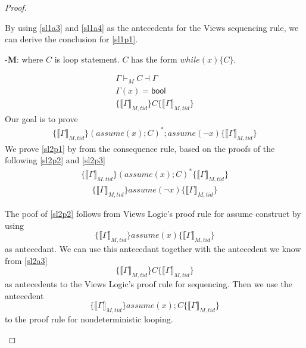 \begin{proof}
\begin{case}
  By using \ref{sl1a3} and \ref{sl1a4} as the antecedents for the Views sequencing rule, we can derive the conclusion for \ref{sl1p1}.
  \end{case}
  
  \begin{case}-\textbf{M}: where $C$ is loop statement. $C$ has the form $while\left(x\right)\{C\}$.

     \begin{gather}\label{sl2a1}
       \Gamma \vdash_{M} C \dashv \Gamma \\
       \label{sl2a2}
       \Gamma(x) = \textsf{bool} \\ 
       \label{sl2a3}
       \{\llbracket \Gamma \rrbracket_{M,tid} \}  C  \{\llbracket \Gamma \rrbracket_{M,tid}\} 
     \end{gather}
    Our goal is to prove
    \begin{gather}\label{sl2p1}
      \{\llbracket \Gamma \rrbracket_{M,tid} \} \left(assume\left(x\right);C\right)^{*};assume(\lnot x) \{\llbracket \Gamma \rrbracket_{M,tid} \}
    \end{gather}
 We prove \ref{sl2p1} by from the consequence rule, based on the proofs of the following \ref{sl2p2} and \ref{sl2p3}
    \begin{gather}\label{sl2p2}
      \{ \llbracket \Gamma \rrbracket_{M,tid} \}\left(assume\left(x\right);C\right)^{*} \{ \llbracket \Gamma \rrbracket_{M,tid} \}
    \end{gather}
    \begin{gather}\label{sl2p3}
      \{ \llbracket \Gamma \rrbracket_{M,tid} \}assume\left(\lnot x\right)\{ \llbracket \Gamma \rrbracket_{M,tid} \}
    \end{gather}
    
   The poof of \ref{sl2p2} follows from Views Logic's proof rule for assume construct by using
      \[\{\llbracket\Gamma \rrbracket_{M,tid}\} assume\left(x\right) \{\llbracket \Gamma \rrbracket_{M,tid} \}\]
      as antecedant. We can use this antecedant together with the antecedent we know from \ref{sl2a3}
      \[\{\llbracket \Gamma \rrbracket_{M,tid} \}C\{\llbracket \Gamma \rrbracket_{M,tid}\}\]
      as antecedents to the Views Logic's proof rule for sequencing. Then we use the antecedent
      \[ \{\llbracket \Gamma \rrbracket_{M,tid} \}assume\left(x\right);C\{\llbracket \Gamma \rrbracket_{M,tid} \}\] to the proof rule for nondeterministic looping.
  

\end{case}
\end{proof}
